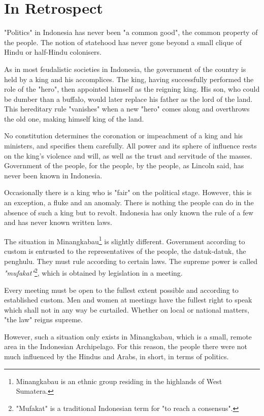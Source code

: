 \section{In Retrospect}

"Politics" in Indonesia has never been "a common good", the common property of the people. 
The notion of statehood has never gone beyond a small clique of Hindu or half-Hindu colonisers.\nline

As in most feudalistic societies in Indonesia, the government of the country is held by a 
king and his accomplices. The king, having successfully performed the role of the "hero", 
then appointed himself as the reigning king. His son, who could be dumber than a buffalo, would 
later replace his father as the lord of the land. This hereditary rule "vanishes" when a 
new "hero" comes along and overthrows the old one, making himself king of the land.\nline

No constitution determines the coronation or impeachment of a king and his ministers, and specifies 
them carefully. All power and its sphere of influence rests on the king's violence and will, as well 
as the trust and servitude of the masses. Government of the people, for the people, by the people, as 
Lincoln said, has never been known in Indonesia.\nline

Occasionally there is a king who is "fair" on the political stage. However, this is 
an exception, a fluke and an anomaly. There is nothing the people can do in the absence of such 
a king but to revolt. Indonesia has only known the rule of a few and has never known written laws.\nline

The situation in Minangkabau\footnote[7]{Minangkabau is an ethnic group residing in the highlands of West Sumatera.}
is slightly different. Government according to custom is entrusted 
to the representatives of the people, the datuk-datuk, the penghulu. They must rule according to 
certain laws. The supreme power is called \emph{"mufakat"}\footnote[8]{"Mufakat" is a traditional Indonesian term for "to reach a consensus".}, 
which is obtained by legislation in a meeting.\nline

Every meeting must be open to the fullest extent possible and according to established custom. 
Men and women at meetings have the fullest right to speak which shall not in any way be curtailed. 
Whether on local or national matters, "the law" reigns supreme.\nline

However, such a situation only exists in Minangkabau, which is a small, remote area in the Indonesian 
Archipelago. For this reason, the people there were not much influenced by the Hindus and Arabs, in short, in terms of politics.\nline

